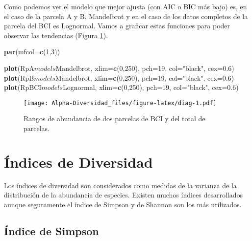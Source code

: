 \documentclass[]{book}
\newenvironment{Shaded}{\begin{snugshade}}{\end{snugshade}}
\newcommand{\KeywordTok}[1]{\textcolor[rgb]{0.13,0.29,0.53}{\textbf{{#1}}}}
\newcommand{\DataTypeTok}[1]{\textcolor[rgb]{0.13,0.29,0.53}{{#1}}}
\newcommand{\DecValTok}[1]{\textcolor[rgb]{0.00,0.00,0.81}{{#1}}}
\newcommand{\FloatTok}[1]{\textcolor[rgb]{0.00,0.00,0.81}{{#1}}}
\newcommand{\StringTok}[1]{\textcolor[rgb]{0.31,0.60,0.02}{{#1}}}
\newcommand{\NormalTok}[1]{{#1}}
\begin{document}
Como podemos ver el modelo que mejor ajusta (con AIC o BIC más bajo) es,
en el caso de la parcela A y B, Mandelbrot y en el caso de los datos
completos de la parcela del BCI es Lognormal. Vamos a graficar estas
funciones para poder observar las tendencias (Figura \ref{fig:diag}).

\begin{Shaded}
\begin{Highlighting}[]
\KeywordTok{par}\NormalTok{(}\DataTypeTok{mfcol=}\KeywordTok{c}\NormalTok{(}\DecValTok{1}\NormalTok{,}\DecValTok{3}\NormalTok{))}

\KeywordTok{plot}\NormalTok{(RpA$models$Mandelbrot, }\DataTypeTok{xlim=}\KeywordTok{c}\NormalTok{(}\DecValTok{0}\NormalTok{,}\DecValTok{250}\NormalTok{), }\DataTypeTok{pch=}\DecValTok{19}\NormalTok{, }\DataTypeTok{col=}\StringTok{"black"}\NormalTok{, }\DataTypeTok{cex=}\FloatTok{0.6}\NormalTok{)}
\KeywordTok{plot}\NormalTok{(RpB$models$Mandelbrot, }\DataTypeTok{xlim=}\KeywordTok{c}\NormalTok{(}\DecValTok{0}\NormalTok{,}\DecValTok{250}\NormalTok{), }\DataTypeTok{pch=}\DecValTok{19}\NormalTok{, }\DataTypeTok{col=}\StringTok{"black"}\NormalTok{, }\DataTypeTok{cex=}\FloatTok{0.6}\NormalTok{)}
\KeywordTok{plot}\NormalTok{(RpBCI$models$Lognormal, }\DataTypeTok{xlim=}\KeywordTok{c}\NormalTok{(}\DecValTok{0}\NormalTok{,}\DecValTok{250}\NormalTok{), }\DataTypeTok{pch=}\DecValTok{19}\NormalTok{, }\DataTypeTok{col=}\StringTok{"black"}\NormalTok{, }\DataTypeTok{cex=}\FloatTok{0.6}\NormalTok{)}
\end{Highlighting}
\end{Shaded}

\begin{figure}[htbp]
\centering
\texttt{[image: Alpha-Diversidad\_files/figure-latex/diag-1.pdf]}
\caption{\label{fig:diag}Rangos de abundancia de dos parcelas de BCI y del
total de parcelas.}
\end{figure}

\section{Índices de Diversidad}\label{indices-de-diversidad}

Los índices de diversidad son considerados como medidas de la varianza
de la distribución de la abundancia de especies. Existen muchos índices
desarrollados aunque seguramente el índice de Simpson y de Shannon son
los más utilizados.

\subsection{Índice de Simpson}\label{indice-de-simpson}
\end{document}
